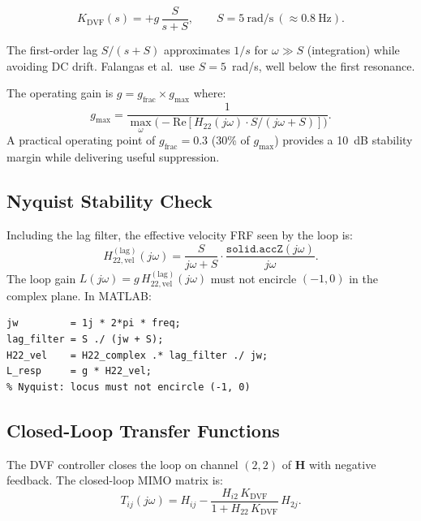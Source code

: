 \documentclass[12pt,a4paper]{article}
\begin{document}
\begin{equation}
  K_\text{DVF}(s) = +g\,\frac{S}{s+S}, \qquad S = 5\ \text{rad/s}\ (\approx 0.8\ \text{Hz}).
  \label{eq:dvf_params}
\end{equation}

The first-order lag $S/(s+S)$ approximates $1/s$ for $\omega \gg S$ (integration)
while avoiding DC drift.  Falangas et al.\ use $S = 5$~rad/s, well below the first
resonance.

The operating gain is $g = g_\text{frac} \times g_\text{max}$ where:
\begin{equation}
  g_\text{max} = \frac{1}{\max_\omega\bigl(-\mathrm{Re}[H_{22}(j\omega)
                 \cdot S/(j\omega + S)]\bigr)}.
  \label{eq:gmax}
\end{equation}
A practical operating point of $g_\text{frac} = 0.3$ (30\% of $g_\text{max}$)
provides a 10~dB stability margin while delivering useful suppression.

\subsection{Nyquist Stability Check}
\label{sec:dvf_nyquist}

Including the lag filter, the effective velocity FRF seen by the loop is:
\begin{equation}
  H_{22,\text{vel}}^{(\text{lag})}(j\omega)
  = \frac{S}{j\omega + S}\cdot\frac{\texttt{solid.accZ}(j\omega)}{j\omega}.
\end{equation}
The loop gain $L(j\omega) = g\,H_{22,\text{vel}}^{(\text{lag})}(j\omega)$ must not
encircle $(-1,0)$ in the complex plane.  In MATLAB:
\begin{verbatim}
jw         = 1j * 2*pi * freq;
lag_filter = S ./ (jw + S);
H22_vel    = H22_complex .* lag_filter ./ jw;
L_resp     = g * H22_vel;
% Nyquist: locus must not encircle (-1, 0)
\end{verbatim}

\subsection{Closed-Loop Transfer Functions}
\label{sec:dvf_cl}

The DVF controller closes the loop on channel $(2,2)$ of $\mathbf{H}$ with
negative feedback.  The closed-loop MIMO matrix is:
\begin{equation}
  T_{ij}(j\omega) = H_{ij}
    - \frac{H_{i2}\,K_\text{DVF}}{1 + H_{22}\,K_\text{DVF}}\,H_{2j}.
  \label{eq:cl_mimo}
\end{equation}
\end{document}
